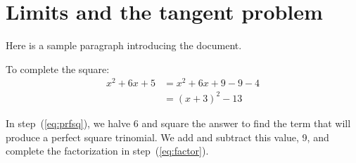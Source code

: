 \documentclass{article}
\begin{document}
\section{Limits and the tangent problem}

Here is a sample paragraph introducing the document.

\begin{example}
	To complete the square:
	\begin{align}
		x^2 + 6x + 5
		 & = x^2 + 6x + 9 - 9 - 4 \label{eq:prfsq} \\
		 & = (x + 3)^2 - 13 \label{eq:factor}
	\end{align}

	In step~(\ref{eq:prfsq}), we halve 6 and square the answer to find the term that will produce a perfect square trinomial.
	We add and subtract this value, 9, and complete the factorization in step~(\ref{eq:factor}).

\end{example}
\end{document}
